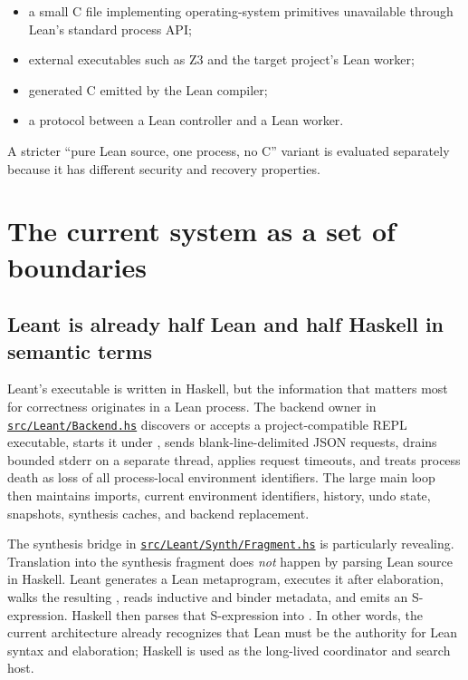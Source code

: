 \documentclass[10pt,letterpaper,oneside]{report}
\newcommand{\code}[1]{\texttt{\detokenize{#1}}}
\def\LeantBase{https://github.com/VladimirReshetnikov/Leant/blob/89663ab01d24f61bc017b8c8b1f52c35573082e4/}
\newcommand{\lpath}[1]{\href{\LeantBase#1}{\nolinkurl{#1}}}
\begin{document}
\begin{itemize}
  \item a small C file implementing operating-system primitives unavailable through Lean's standard process API;
  \item external executables such as Z3 and the target project's Lean worker;
  \item generated C emitted by the Lean compiler;
  \item a protocol between a Lean controller and a Lean worker.
\end{itemize}

A stricter ``pure Lean source, one process, no C'' variant is evaluated separately because it has different security and recovery properties.

\chapter{The current system as a set of boundaries}\label{ch:current}

\section{Leant is already half Lean and half Haskell in semantic terms}

Leant's executable is written in Haskell, but the information that matters most for correctness originates in a Lean process. The backend owner in \lpath{src/Leant/Backend.hs} discovers or accepts a project-compatible REPL executable, starts it under \code{lake env}, sends blank-line-delimited JSON requests, drains bounded stderr on a separate thread, applies request timeouts, and treats process death as loss of all process-local environment identifiers. The large main loop then maintains imports, current environment identifiers, history, undo state, snapshots, synthesis caches, and backend replacement.

The synthesis bridge in \lpath{src/Leant/Synth/Fragment.hs} is particularly revealing. Translation into the synthesis fragment does \emph{not} happen by parsing Lean source in Haskell. Leant generates a Lean metaprogram, executes it after elaboration, walks the resulting \code{Expr}, reads inductive and binder metadata, and emits an S-expression. Haskell then parses that S-expression into \code{Frag}. In other words, the current architecture already recognizes that Lean must be the authority for Lean syntax and elaboration; Haskell is used as the long-lived coordinator and search host.
\end{document}
